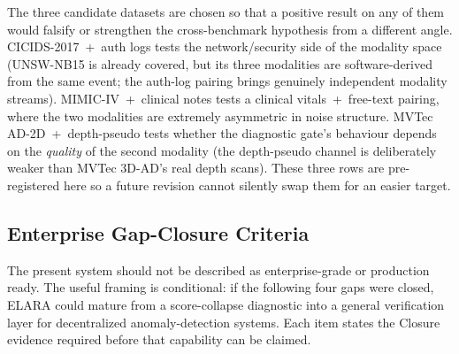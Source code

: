 \documentclass[10pt,conference]{IEEEtran}
\newcommand{\system}{ELARA}
\begin{document}

The three candidate datasets are chosen so that a positive result on
any of them would falsify or strengthen the cross-benchmark
hypothesis from a different angle. CICIDS-2017~+~auth logs tests the
network/security side of the modality space (UNSW-NB15 is already
covered, but its three modalities are software-derived from the same
event; the auth-log pairing brings genuinely independent
modality streams). MIMIC-IV~+~clinical notes tests a clinical
vitals~+~free-text pairing, where the two modalities are extremely
asymmetric in noise structure. MVTec AD-2D~+~depth-pseudo tests
whether the diagnostic gate's behaviour depends on the
\emph{quality} of the second modality (the depth-pseudo channel is
deliberately weaker than MVTec 3D-AD's real depth scans). These
three rows are pre-registered here so a future revision cannot
silently swap them for an easier target.

\subsection{Enterprise Gap-Closure Criteria}
The present system should not be described as enterprise-grade or production
ready. The useful framing is conditional: if the following four gaps were closed,
\system{} could mature from a score-collapse diagnostic into a general
verification layer for decentralized anomaly-detection systems. Each item states
the Closure evidence required before that capability can be claimed.
\end{document}
